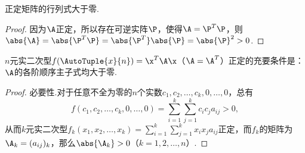 \begin{corollary}
正定矩阵的行列式大于零.
\begin{proof}
因为\(\A\)正定，所以存在可逆实阵\(\P\)，使得\(\A=\P^T\P\)，则\(\abs{\A}=\abs{\P^T\P}=\abs{\P^T}\abs{\P}=\abs{\P}^2>0\).
\end{proof}
\end{corollary}

\begin{theorem}
\(n\)元实二次型\(f(\AutoTuple{x}{n}) = \x^T\A\x\)（\(\A=\A^T\)）正定的充要条件是：\(\A\)的各阶顺序主子式均大于零.
\begin{proof}
必要性.对于任意不全为零的\(n\)个实数\(c_1,c_2,\dotsc,c_k,0,\dotsc,0\)，总有\[
f(c_1,c_2,\dotsc,c_k,0,\dotsc,0) = \sum\limits_{i=1}^k \sum\limits_{j=1}^k c_i c_j a_{ij} > 0,
\]从而\(k\)元实二次型\(f_k(x_1,x_2,\dotsc,x_k) = \sum\limits_{i=1}^k \sum\limits_{j=1}^k x_i x_j a_{ij}\)正定，而\(f_k\)的矩阵为\(\A_k = (a_{ij})_k\)，那么\(\abs{\A_k} > 0\)（\(k=1,2,\dotsc,n\)）.


\end{proof}
\end{theorem}
